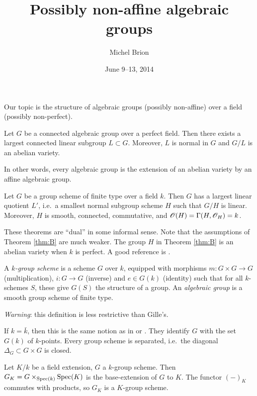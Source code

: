 \documentclass{article}
\title{Possibly non-affine algebraic groups}
\author{Michel Brion}
\date{June 9--13, 2014}
\begin{document}
\maketitle
\tableofcontents





Our topic is the structure of algebraic groups (possibly non-affine) over 
a field (possibly non-perfect). 

\begin{theorem}\label{thm:A}
Let $G$ be a connected algebraic group over a perfect field. Then there exists 
a largest connected linear subgroup $L\subset G$. Moreover, $L$ is normal 
in $G$ and $G/L$ is an abelian variety. 
\end{theorem}

In other words, every algebraic group is the extension of an abelian variety by 
an affine algebraic group. 

\begin{theorem}\label{thm:B}
Let $G$ be a group scheme of finite type over a field $k$. Then $G$ has a 
largest linear quotient $L'$, i.e.~a smallest normal subgroup scheme $H$ such 
that $G/H$ is linear. Moreover, $H$ is smooth, connected, commutative, and 
$\mathscr{O}(H) = \Gamma(H,\mathscr{O}_H) = k$. 
\end{theorem}

These theorems are ``dual'' in some informal sense. Note that the assumptions 
of Theorem \ref{thm:B} are much weaker. The group $H$ in Theorem \ref{thm:B} 
is an abelian variety when $k$ is perfect. 
A good reference is \cite{m14}. 

\begin{definition}
A \emph{$k$-group scheme} is a scheme $G$ over $k$, equipped with morphisms 
$m:G\times G\to G$ (multiplication), $i:G\to G$ (inverse) and 
$e\in G(k)$ (identity) such that for all $k$-schemes $S$, these give 
$G(S)$ the structure of a group. An \emph{algebraic group} is a smooth group 
scheme of finite type. 
\end{definition}

\emph{Warning}: this definition is less restrictive than Gille's. 

If $k=\bar k$, then this is the same notion as in \cite{b91} or \cite{s09}. 
They identify $G$ with the set $G(k)$ of $k$-points. 
Every group scheme is separated, i.e.\ the diagonal $\Delta_G\subset G\times G$ 
is closed. 

Let $K/k$ be a field extension, $G$ a $k$-group scheme. Then 
$G_K=G\times_{\operatorname{Spec}(k)} \operatorname{Spec}(K)$ is the base-extension of $G$ to 
$K$. The functor $(-)_K$ commutes with products, so $G_K$ is a $K$-group 
scheme. 
\end{document}
